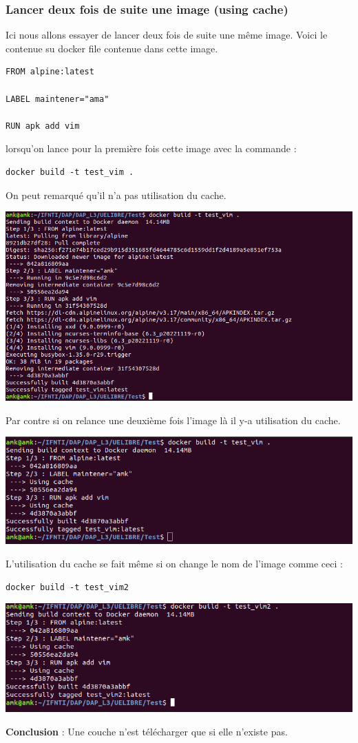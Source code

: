 \documentclass[12pt,a4paper]{article}
\begin{document}
\subsubsection{Lancer deux fois de suite une image (using cache)}
Ici nous allons essayer de lancer deux fois de suite une même image. Voici 
le contenue su docker file contenue dans cette image.
\begin{verbatim}
FROM alpine:latest

LABEL maintener="ama"

RUN apk add vim
\end{verbatim}
lorsqu'on lance pour la première fois cette image avec la commande :
\begin{verbatim}
docker build -t test_vim .
\end{verbatim}
On peut remarqué qu'il n'a pas utilisation du cache.
\begin{center}
\includegraphics[scale=0.5]{img/test_vim.png}
\end{center}
Par contre si on relance une deuxième fois l'image là il y-a utilisation du cache.
\begin{center}
\includegraphics[scale=0.5]{img/test_vim_cache.png}
\end{center}
L'utilisation du cache se fait même si on change le nom de l'image comme ceci :
\begin{verbatim}
docker build -t test_vim2
\end{verbatim}
\begin{center}
\includegraphics[scale=0.5]{img/test_vim3.png}
\end{center}
\textbf{Conclusion } : Une couche n'est télécharger que si elle n'existe pas.
\end{document}

